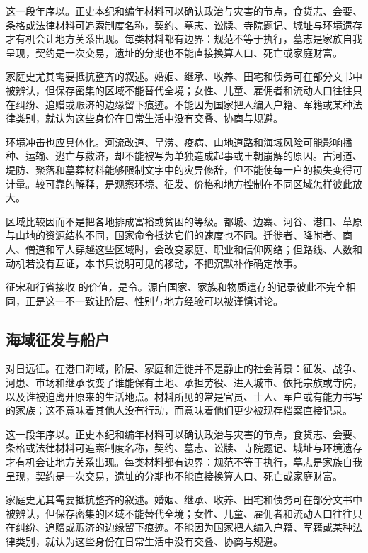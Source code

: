 这一段年序以。正史本纪和编年材料可以确认政治与灾害的节点，食货志、会要、条格或法律材料可追索制度名称，契约、墓志、讼牍、寺院题记、城址与环境遗存才有机会让地方关系出现。每类材料都有边界：规范不等于执行，墓志是家族自我呈现，契约是一次交易，遗址的分期也不能直接换算人口、死亡或家庭财富。

家庭史尤其需要抵抗整齐的叙述。婚姻、继承、收养、田宅和债务可在部分文书中被辨认，但保存密集的区域不能替代全境；女性、儿童、雇佣者和流动人口往往只在纠纷、追赠或赈济的边缘留下痕迹。不能因为国家把人编入户籍、军籍或某种法律类别，就认为这些身份在日常生活中没有交叠、协商与规避。

环境冲击也应具体化。河流改道、旱涝、疫病、山地道路和海域风险可能影响播种、运输、逃亡与救济，却不能被写为单独造成起事或王朝崩解的原因。古河道、堤防、聚落和墓葬材料能够限制文字中的灾异修辞，但不能使每一户的损失变得可计量。较可靠的解释，是观察环境、征发、价格和地方控制在不同区域怎样彼此放大。

区域比较因而不是把各地排成富裕或贫困的等级。都城、边寨、河谷、港口、草原与山地的资源结构不同，国家命令抵达它们的速度也不同。迁徙者、降附者、商人、僧道和军人穿越这些区域时，会改变家庭、职业和信仰网络；但路线、人数和动机若没有互证，本书只说明可见的移动，不把沉默补作确定故事。

征宋和行省接收 的价值，是令。源自国家、家族和物质遗存的记录彼此不完全相同，正是这一不一致让阶层、性别与地方经验可以被谨慎讨论。

\subsection{海域征发与船户}

对日远征。在港口海域，阶层、家庭和迁徙并不是静止的社会背景：征发、战争、河患、市场和继承改变了谁能保有土地、承担劳役、进入城市、依托宗族或寺院，以及谁被迫离开原来的生活地点。材料所见的常是官员、士人、军户或有能力书写的家族；这不意味着其他人没有行动，而意味着他们更少被现存档案直接记录。

这一段年序以。正史本纪和编年材料可以确认政治与灾害的节点，食货志、会要、条格或法律材料可追索制度名称，契约、墓志、讼牍、寺院题记、城址与环境遗存才有机会让地方关系出现。每类材料都有边界：规范不等于执行，墓志是家族自我呈现，契约是一次交易，遗址的分期也不能直接换算人口、死亡或家庭财富。

家庭史尤其需要抵抗整齐的叙述。婚姻、继承、收养、田宅和债务可在部分文书中被辨认，但保存密集的区域不能替代全境；女性、儿童、雇佣者和流动人口往往只在纠纷、追赠或赈济的边缘留下痕迹。不能因为国家把人编入户籍、军籍或某种法律类别，就认为这些身份在日常生活中没有交叠、协商与规避。

